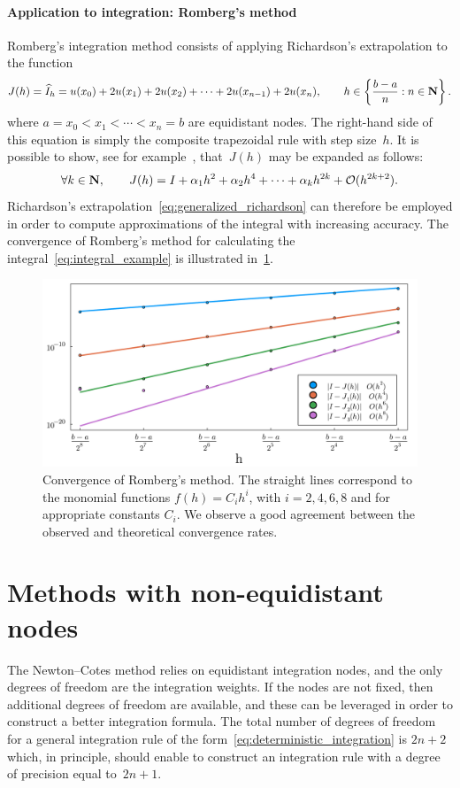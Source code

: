 \paragraph{Application to integration: Romberg's method}
Romberg's integration method consists of applying Richardson's extrapolation to the function
\[
    J(h) = \widehat I_h = u(x_0) + 2 u(x_1) + 2 u(x_2) + \dotsb + 2 u(x_{n-1}) + 2 u(x_n), \qquad h \in \left\{ \frac{b-a}{n}: n \in \mathbf N\right\}.
\]
where $a = x_0 < x_1 < \dotsb < x_n = b$ are equidistant nodes.
The right-hand side of this equation is simply the composite trapezoidal rule with step size~$h$.
It is possible to show, see for example~\cite[Property 9.3]{MR2265914},
that~$J(h)$ may be expanded as follows:
\[
    \forall k \in \mathbf N, \qquad
    J(h) = I + \alpha_1 h^2 + \alpha_2 h^4 + \cdots + \alpha_k h^{2k} + \mathcal O(h^{2k+2}).
\]
Richardson's extrapolation~\eqref{eq:generalized_richardson} can therefore be employed in order to compute approximations of the integral with increasing accuracy.
The convergence of Romberg's method for calculating the integral~\eqref{eq:integral_example} is illustrated in~\cref{fig:romberg}.
\begin{figure}[ht]
    \centering
    \includegraphics[width=0.95\linewidth]{figures/romberg.pdf}
    \caption{Convergence of Romberg's method. The straight lines correspond to the monomial functions $f(h) = C_i h^i$,
    with $i = 2, 4, 6, 8$ and for appropriate constants $C_i$.
    We observe a good agreement between the observed and theoretical convergence rates.}%
    \label{fig:romberg}
\end{figure}

\section{Methods with non-equidistant nodes}
The Newton--Cotes method relies on equidistant integration nodes,
and the only degrees of freedom are the integration weights.
If the nodes are not fixed,
then additional degrees of freedom are available,
and these can be leveraged in order to construct a better integration formula.
The total number of degrees of freedom for a general integration rule of the form~\eqref{eq:deterministic_integration} is $2n + 2$ which,
in principle, should enable to construct an integration rule with a degree of precision equal to~$2n+1$.

